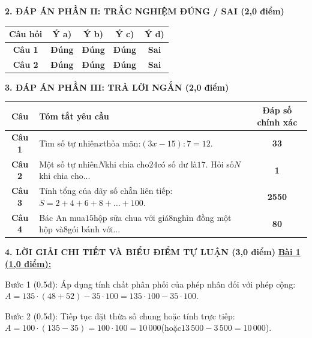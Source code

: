 \documentclass[11pt,a4paper]{article}
\begin{document}
\noindent\textbf{\large 2. ĐÁP ÁN PHẦN II: TRẮC NGHIỆM ĐÚNG / SAI (2,0 điểm)}
\vspace{4pt}
\begin{center}
\begin{tabular}{|c|c|c|c|c|}
\hline
\textbf{Câu hỏi} & \textbf{Ý a)} & \textbf{Ý b)} & \textbf{Ý c)} & \textbf{Ý d)} \\
\hline
\textbf{Câu 1} & \textbf{Đúng} & \textbf{Đúng} & \textbf{Đúng} & \textbf{Sai} \\
\hline
\textbf{Câu 2} & \textbf{Đúng} & \textbf{Đúng} & \textbf{Đúng} & \textbf{Sai} \\
\hline
\end{tabular}
\end{center}
\vspace{6pt}


\noindent\textbf{\large 3. ĐÁP ÁN PHẦN III: TRẢ LỜI NGẮN (2,0 điểm)}
\vspace{4pt}
\begin{center}
\begin{tabular}{|c|m{11cm}|c|}
\hline
\textbf{Câu} & \textbf{Tóm tắt yêu cầu} & \textbf{Đáp số chính xác} \\
\hline
\textbf{Câu 1} & Tìm số tự nhiên$x$thỏa mãn:$(3x - 15) : 7 = 12$. & \textbf{33} \\
\hline
\textbf{Câu 2} & Một số tự nhiên$N$khi chia cho$24$có số dư là$17$. Hỏi số$N$khi chia cho... & \textbf{1} \\
\hline
\textbf{Câu 3} & Tính tổng của dãy số chẵn liên tiếp:$S = 2 + 4 + 6 + 8 + \dots + 100$. & \textbf{2550} \\
\hline
\textbf{Câu 4} & Bác An mua$15$hộp sữa chua với giá$8$nghìn đồng một hộp và$8$gói bánh với... & \textbf{80} \\
\hline
\end{tabular}
\end{center}
\vspace{6pt}


\noindent\textbf{\large 4. LỜI GIẢI CHI TIẾT VÀ BIỂU ĐIỂM TỰ LUẬN (3,0 điểm)}
\vspace{4pt}
\noindent\textbf{\underline{Bài 1 (1,0 điểm):}}\par\vspace{3pt}
Bước 1 (0.5đ): Áp dụng tính chất phân phối của phép nhân đối với phép cộng:$A = 135 \cdot (48 + 52) - 35 \cdot 100 = 135 \cdot 100 - 35 \cdot 100$.\par\noindent Bước 2 (0.5đ): Tiếp tục đặt thừa số chung hoặc tính trực tiếp:$A = 100 \cdot (135 - 35) = 100 \cdot 100 = 10\,000$(hoặc$13\,500 - 3\,500 = 10\,000$).\par\vspace{8pt}
\end{document}
